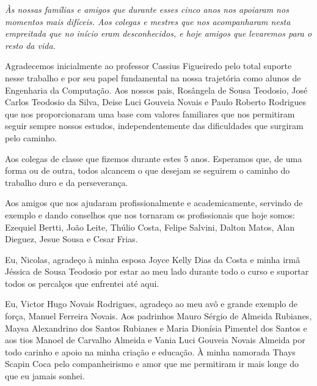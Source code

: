 \cleardoublepage
\thispagestyle{empty}
\vspace*{200mm}

\begin{flushright}
{\em 
Às nossas famílias e amigos que durante esses cinco anos nos apoiaram nos momentos mais difíceis.
Aos colegas e mestres que nos acompanharam nesta empreitada que no início eram desconhecidos, e hoje amigos que levaremos para o resto da vida.
}
\end{flushright}
\newpage


\hspace{5mm}
Agradecemos inicialmente ao professor Cassius Figueiredo pelo total suporte nesse trabalho e por seu papel fundamental na nossa trajetória como alunos de Engenharia da Computação. Aos nossos pais, Rosângela de Sousa Teodosio, José Carlos Teodosio da Silva, Deise Luci Gouveia Novais e Paulo Roberto Rodrigues que nos proporcionaram uma base com valores familiares que nos permitiram seguir sempre nossos estudos, independentemente das dificuldades que surgiram pelo caminho.

Aos colegas de classe que fizemos durante estes 5 anos. Esperamos que, de uma forma ou de outra, todos alcancem o que desejam se seguirem o caminho do trabalho duro e da perseverança.

Aos amigos que nos ajudaram profissionalmente e academicamente, servindo de exemplo e dando conselhos que nos tornaram os profissionais que hoje somos: Ezequiel Bertti, João Leite, Thúlio Costa, Felipe Salvini, Dalton Matos, Alan Dieguez, Jesue Sousa e Cesar Frias.

Eu, Nicolas, agradeço à minha esposa Joyce Kelly Dias da Costa e minha irmã Jéssica de Sousa Teodosio por estar ao meu lado durante todo o curso e suportar todos os percalços que enfrentei até aqui.

Eu, Victor Hugo Novais Rodrigues, agradeço ao meu avô e grande exemplo de força, Manuel Ferreira Novais. Aos padrinhos Mauro Sérgio de Almeida Rubianes, Maysa Alexandrino dos Santos Rubianes e Maria Dionísia Pimentel dos Santos e aos tios Manoel de Carvalho Almeida e Vania Luci Gouveia Novais Almeida por todo carinho e apoio na minha criação e educação. À minha namorada Thays Scapin Coca pelo companheirismo e amor que me permitiram ir mais longe do que eu jamais sonhei.

